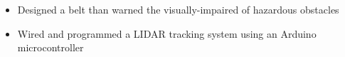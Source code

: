 \documentclass{resume}
\begin{document}


\begin{itemize}
  \item Designed a belt than warned the visually-impaired of hazardous obstacles
  \item Wired and programmed a LIDAR tracking system using an Arduino microcontroller
\end{itemize}

\end{document}
